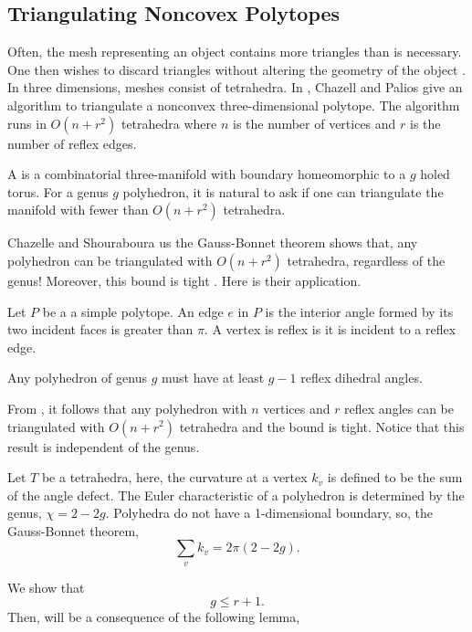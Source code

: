 \subsection{Triangulating Noncovex Polytopes}

Often, the mesh representing
an object contains more triangles than is necessary. One then wishes to
discard triangles without altering the geometry of the object \cite{simplify-mesh-1999}.
In three dimensions, meshes consist of tetrahedra. 
In \cite{triangulating-polytope-1990}, Chazell and Palios give an
algorithm to triangulate a nonconvex three-dimensional polytope.
The algorithm runs in $O(n+r^2)$ tetrahedra where $n$ is the number
of vertices and $r$ is the number of reflex edges.

A   is a combinatorial three-manifold with 
boundary homeomorphic to a $g$ holed torus.
For a genus $g$ polyhedron, it is natural to ask if one can 
triangulate the manifold with fewer than $O(n+r^2)$ tetrahedra.


Chazelle and Shouraboura us the 
 Gauss-Bonnet theorem shows that, any polyhedron
can be triangulated with $O(n+r^2)$ tetrahedra, regardless  of 
the genus! Moreover, this bound is tight \cite{tetra-bounds-c-s-1994}.
Here is their application.

Let $P$ be a a simple polytope. An edge $e$ in $P$ is
 the interior angle formed by its two incident faces
is greater than $\pi$.
A vertex is reflex is it is incident to a reflex edge.

\begin{theorem}\label{thm:reflex}

Any polyhedron of genus $g$ must have 
at least $g-1$ reflex dihedral angles. 

\end{theorem}

From , it follows that any polyhedron
with $n$ vertices and $r$ reflex angles
can be triangulated with $O(n+r^2)$ tetrahedra 
and the bound is tight. Notice that this result is independent
of the genus.

Let $T$ be a tetrahedra, here, the curvature at a vertex $k_v$ is defined to
be the sum of the angle defect.
The Euler characteristic of a polyhedron is determined by the genus,
$\chi=2-2g$.
Polyhedra do not have a 1-dimensional boundary, 
so, the Gauss-Bonnet theorem,
$$\sum_vk_v=2\pi (2-2g).$$

We show that
$$g\leq r+1.$$ 
Then,  will be a consequence of the following
lemma,

